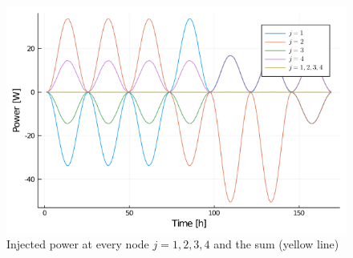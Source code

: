 \begin{figure}[h]
	\centering
	\includegraphics[scale=0.6]{pictures/plots/manual_calc_variation_kappa/kappa_1/K_1/energy_bilance.png}
	\caption{Injected power at every node $j=1,2,3,4$ and the sum (yellow line)}
	\label{fig:energy_bilance}
\end{figure}  
